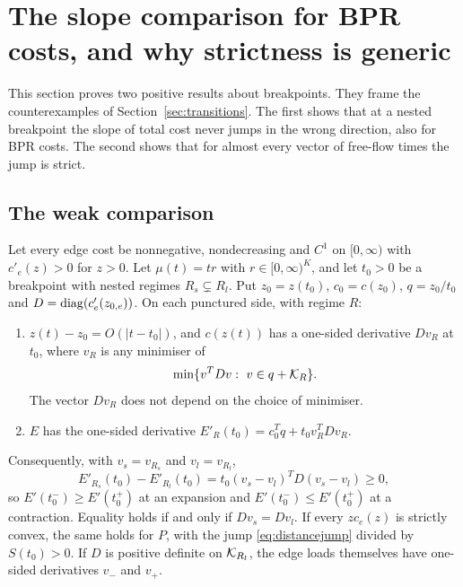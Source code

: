 \section{The slope comparison for BPR costs, and why strictness is generic}\label{sec:comparison}

This section proves two positive results about breakpoints. They frame the counterexamples of Section~\ref{sec:transitions}. The first shows that at a nested breakpoint the slope of total cost never jumps in the wrong direction, also for BPR costs. The second shows that for almost every vector of free-flow times the jump is strict.

\subsection{The weak comparison}

\begin{theorem}\label{thm:weakcomparison}
Let every edge cost be nonnegative, nondecreasing and $C^1$ on $[0,\infty)$ with $c'_e(z)>0$ for $z>0$. Let $\mu(t)=tr$ with $r\in[0,\infty)^K$, and let $t_0>0$ be a breakpoint with nested regimes $R_s\subsetneq R_l$. Put $z_0=z(t_0)$, $c_0=c(z_0)$, $q=z_0/t_0$ and $D=\operatorname{diag}(c'_e(z_{0,e}))$. On each punctured side, with regime $R$:
\begin{enumerate}[label=(\alph*),nosep]
\item $z(t)-z_0=O(|t-t_0|)$, and $c(z(t))$ has a one-sided derivative $Dv_R$ at $t_0$, where $v_R$ is any minimiser of
\begin{equation}\label{eq:quadratic}
 \min\{v^TDv:\ v\in q+\mathcal K_R\}.
\end{equation}
The vector $Dv_R$ does not depend on the choice of minimiser.
\item $E$ has the one-sided derivative $E'_R(t_0)=c_0^Tq+t_0v_R^TDv_R$.
\end{enumerate}
Consequently, with $v_s=v_{R_s}$ and $v_l=v_{R_l}$,
\begin{equation}\label{eq:distancejump}
 E'_{R_s}(t_0)-E'_{R_l}(t_0)=t_0(v_s-v_l)^TD(v_s-v_l)\ge0,
\end{equation}
so $E'(t_0^-)\ge E'(t_0^+)$ at an expansion and $E'(t_0^-)\le E'(t_0^+)$ at a contraction. Equality holds if and only if $Dv_s=Dv_l$. If every $zc_e(z)$ is strictly convex, the same holds for $P$, with the jump \eqref{eq:distancejump} divided by $S(t_0)>0$. If $D$ is positive definite on $\mathcal K_{R_l}$, the edge loads themselves have one-sided derivatives $v_-$ and $v_+$.
\end{theorem}

